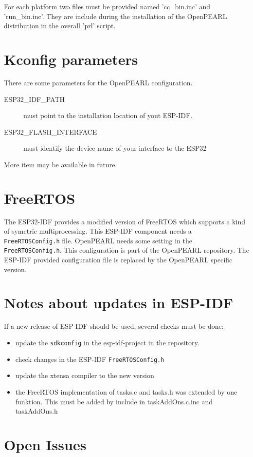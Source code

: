 For each platform two files must be provided named 'cc\_bin.inc'
and 'run\_bin.inc'. They are include during the installation of the OpenPEARL
distribution in the overall 'prl' script.

\section{Kconfig parameters}
There are some parameters for the OpenPEARL configuration.
\begin{description}
\item[ESP32\_IDF\_PATH] must point to the installation location of yout ESP-IDF.
\item[ESP32\_FLASH\_INTERFACE] must identify the device name
   of your interface to the ESP32
\end{description}
More item may be available in future.

\section{FreeRTOS}
The ESP32-IDF provides a modified version of FreeRTOS which supports a kind of 
symetric multiprocessing.
This ESP-IDF component needs a \verb|FreeRTOSConfig.h| file.
OpenPEARL needs some setting in the \verb|FreeRTOSConfig.h|. 
This configuration is part of the OpenPEARL repository. The ESP-IDF provided
configuration file is replaced by the OpenPEARL specific version.

\section{Notes about updates in ESP-IDF}
If a new release of ESP-IDF should be used, several checks must be done:
\begin{itemize}
\item update the \verb|sdkconfig| in the esp-idf-project in the repository.
\item check changes in the ESP-IDF \verb|FreeRTOSConfig.h|
\item update the xtensa compiler to the new version
\item the FreeRTOS implementation of tasks.c and tasks.h was extended by one
  funktion. This must be added by include in taskAddOns.c.inc and taskAddOns.h
\end{itemize}

\section{Open Issues}
